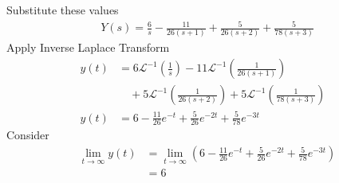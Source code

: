 \documentclass[journal,12pt,twocolumn]{IEEEtran}
\theoremstyle{remark}
\renewcommand{\brak}[1]{\left(#1\right)}
\begin{document}
Substitute these values 
\begin{align}
Y(s) = \frac{6}{s} - \frac{11}{26\brak{s+1}} + \frac{5}{26\brak{s+2}} + \frac{5}{78\brak{s+3}}
\end{align}
Apply Inverse Laplace Transform 
\begin{align}
y(t) &= 6\mathcal{L}^{-1}\brak{\frac{1}{s}} - 11\mathcal{L}^{-1}\brak{\frac{1}{26(s+1)}} & \nonumber \\
&\quad + 5\mathcal{L}^{-1}\brak{\frac{1}{26(s+2)}} + 5\mathcal{L}^{-1}\brak{\frac{1}{78(s+3)}} \\
y(t) &= 6 - \frac{11}{26}e^{-t} + \frac{5}{26}e^{-2t} +\frac{5}{78}e^{-3t}
\end{align}
Consider
\begin{align}
\lim_{t \to \infty} y(t) &= \lim_{t \to \infty} \brak{6 - \frac{11}{26}e^{-t} + \frac{5}{26}e^{-2t} +\frac{5}{78}e^{-3t}} \\
&= 6
\end{align}
\end{document}
